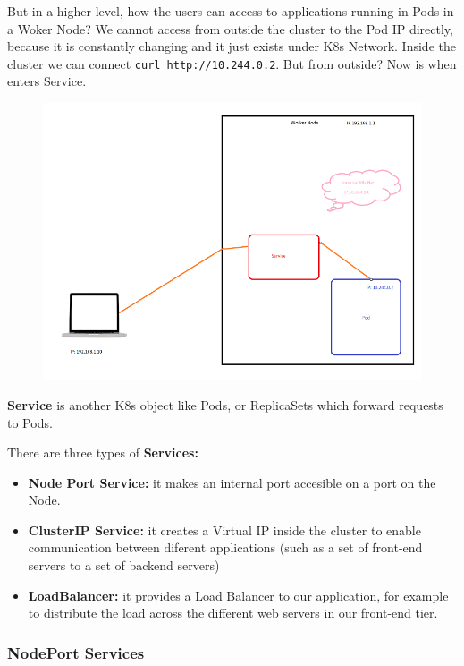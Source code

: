 \documentclass{article}
\begin{document}
But in a higher level, how the users can access to applications running in Pods in a Woker Node?
We cannot access from outside the cluster to the Pod IP directly, because it is constantly changing and it just exists under K8s Network. Inside the cluster we can connect \verb|curl http://10.244.0.2|. But from outside? Now is when enters Service.

\begin{figure}[H]
    \centering
    \includegraphics[width=\textwidth]{pictures/services2.png}
\end{figure}

\textbf{Service} is another K8s object like Pods, or ReplicaSets which forward requests to Pods.

There are three types of \textbf{Services:}
\begin{itemize}
    \item \textbf{Node Port Service:} it makes an internal port accesible on a port on the Node.
    \item \textbf{ClusterIP Service:} it creates a Virtual IP inside the cluster to enable communication between diferent applications (such as a set of front-end servers to a set of backend servers)
    \item \textbf{LoadBalancer:} it provides a Load Balancer to our application, for example to distribute the load across the different web servers in our front-end tier.
\end{itemize}

\subsubsection{NodePort Services}
\end{document}
